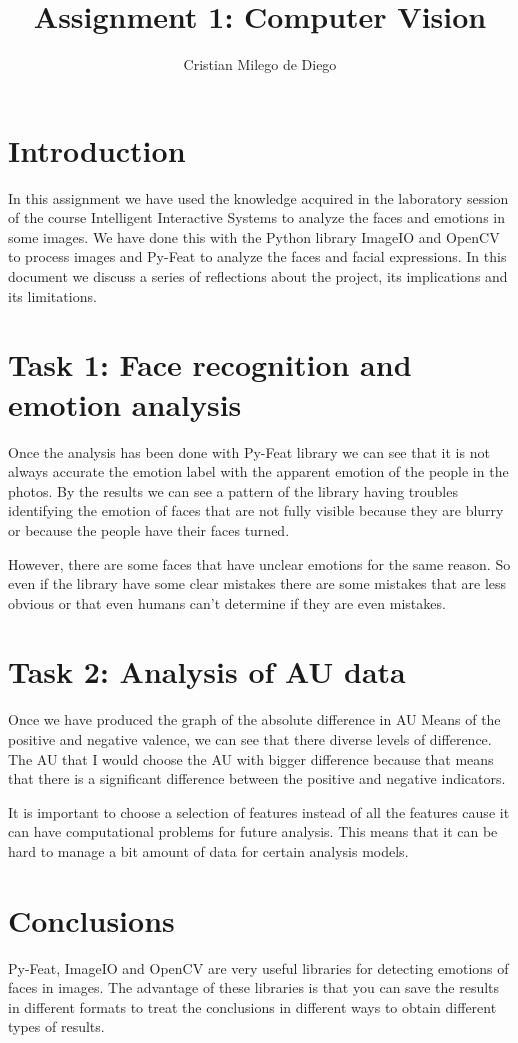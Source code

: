 \documentclass[11pt]{article}
\title{Assignment 1: Computer Vision}
\author{Cristian Milego de Diego}
\begin{document}
\maketitle

\section{Introduction}
In this assignment we have used the knowledge acquired in the laboratory session of the course Intelligent Interactive Systems to analyze the faces and emotions in some images. We have done this with the Python library ImageIO and OpenCV to process images and Py-Feat to analyze the faces and facial expressions. In this document we discuss a series of reflections about the project, its implications and its limitations.

\section{Task 1: Face recognition and emotion analysis}

Once the analysis has been done with Py-Feat library we can see that it is not always accurate the emotion label with the apparent emotion of the people in the photos. By the results we can see a pattern of the library having troubles identifying the emotion of faces that are not fully visible because they are blurry or because the people have their faces turned.

However, there are some faces that have unclear emotions for the same reason. So even if the library have some clear mistakes there are some mistakes that are less obvious or that even humans can't determine if they are even mistakes.

\section{Task 2: Analysis of AU data}

Once we have produced the graph of the absolute difference in AU Means of the positive and negative valence, we can see that there diverse levels of difference. The AU that I would choose the AU with bigger difference because that means that there is a significant difference between the positive and negative indicators.

It is important to choose a selection of features instead of all the features cause it can have computational problems for future analysis. This means that it can be hard to manage a bit amount of data for certain analysis models.

\section{Conclusions}

Py-Feat, ImageIO and OpenCV are very useful libraries for detecting emotions of faces in images. The advantage of these libraries is that you can save the results in different formats to treat the conclusions in different ways to obtain different types of results.
\end{document}
